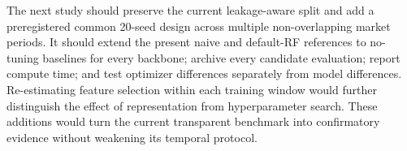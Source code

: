 The next study should preserve the current leakage-aware split and add a preregistered common 20-seed design across multiple non-overlapping market periods. It should extend the present naive and default-RF references to no-tuning baselines for every backbone; archive every candidate evaluation; report compute time; and test optimizer differences separately from model differences. Re-estimating feature selection within each training window would further distinguish the effect of representation from hyperparameter search. These additions would turn the current transparent benchmark into confirmatory evidence without weakening its temporal protocol.
